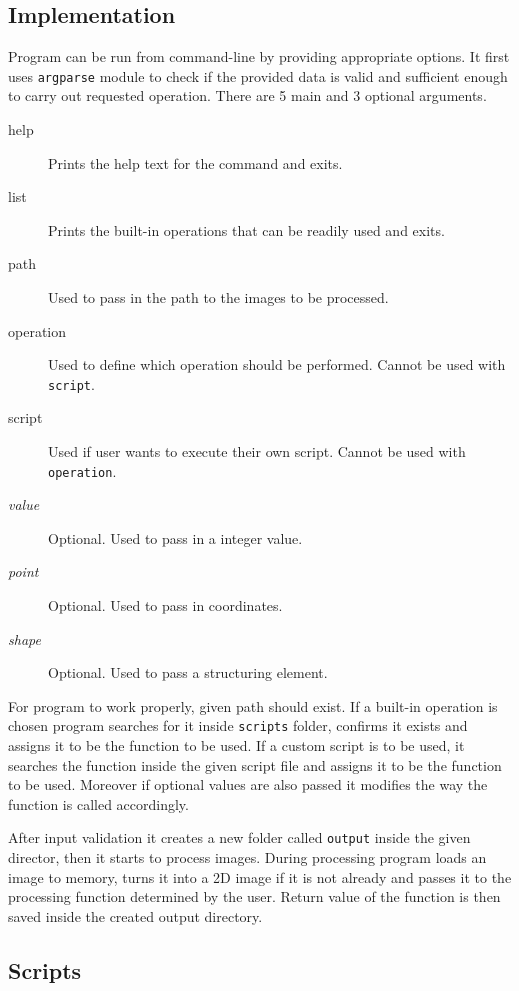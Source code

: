 \documentclass[conference,compsoc]{IEEEtran}
\begin{document}
\subsection{Implementation}
Program can be run from command-line by providing appropriate options. It first uses \texttt{argparse} module to check if the provided data is valid and sufficient enough to carry out requested operation. There are 5 main and  3 optional arguments.
\begin{description}
\item [help] Prints the help text for the command and exits.
\item [list] Prints the built-in operations that can be readily used and exits.
\item [path] Used to pass in the path to the images to be processed.
\item [operation] Used to define which operation should be performed. Cannot be used with \texttt{script}.
\item [script] Used if user wants to execute their own script. Cannot be used with \texttt{operation}.
\item [\textit{value}] Optional. Used to pass in a integer value.
\item [\textit{point}] Optional. Used to pass in coordinates.
\item [\textit{shape}] Optional. Used to pass a structuring element.
\end{description}

For program to work properly, given path should exist. If a built-in operation is chosen program searches for it inside \texttt{scripts} folder, confirms it exists and assigns it to be the function to be used. If a custom script is to be used, it searches the function inside the given script file and assigns it to be the function to be used. Moreover if optional values are also passed it modifies the way the function is called accordingly.

After input validation it creates a new folder called \texttt{output} inside the given director, then it starts to process images. During processing program loads an image to memory, turns it into a 2D image if it is not already and passes it to the processing function determined by the user. Return value of the function is then saved inside the created output directory.

\subsection{Scripts}
\end{document}
